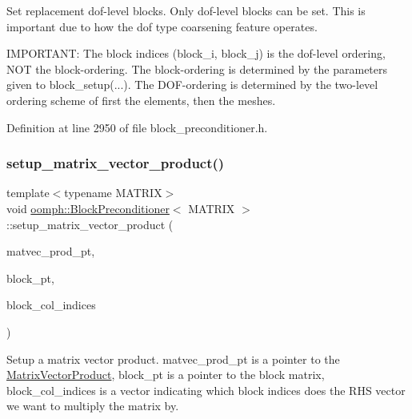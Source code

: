 Set replacement dof-\/level blocks. Only dof-\/level blocks can be set. This is important due to how the dof type coarsening feature operates. 

I\+M\+P\+O\+R\+T\+A\+NT\+: The block indices (block\+\_\+i, block\+\_\+j) is the dof-\/level ordering, N\+OT the block-\/ordering. The block-\/ordering is determined by the parameters given to block\+\_\+setup(...). The D\+O\+F-\/ordering is determined by the two-\/level ordering scheme of first the elements, then the meshes. 

Definition at line 2950 of file block\+\_\+preconditioner.\+h.

\mbox{\label{classoomph_1_1BlockPreconditioner_adbe1ae854ee9831649249d50162bb6a9}} 
\subsubsection{\texorpdfstring{setup\+\_\+matrix\+\_\+vector\+\_\+product()}{setup\_matrix\_vector\_product()}\hspace{0.1cm}{\footnotesize\ttfamily [1/2]}}
{\footnotesize\ttfamily template$<$typename M\+A\+T\+R\+IX$>$ \\
void \hyperlink{classoomph_1_1BlockPreconditioner}{oomph\+::\+Block\+Preconditioner}$<$ M\+A\+T\+R\+IX $>$\+::setup\+\_\+matrix\+\_\+vector\+\_\+product (\begin{DoxyParamCaption}\item[{\hyperlink{classoomph_1_1MatrixVectorProduct}{Matrix\+Vector\+Product} $\ast$}]{matvec\+\_\+prod\+\_\+pt,  }\item[{\hyperlink{classoomph_1_1CRDoubleMatrix}{C\+R\+Double\+Matrix} $\ast$}]{block\+\_\+pt,  }\item[{const \hyperlink{classoomph_1_1Vector}{Vector}$<$ unsigned $>$ \&}]{block\+\_\+col\+\_\+indices }\end{DoxyParamCaption})\hspace{0.3cm}{\ttfamily [inline]}}



Setup a matrix vector product. matvec\+\_\+prod\+\_\+pt is a pointer to the \hyperlink{classoomph_1_1MatrixVectorProduct}{Matrix\+Vector\+Product}, block\+\_\+pt is a pointer to the block matrix, block\+\_\+col\+\_\+indices is a vector indicating which block indices does the R\+HS vector we want to multiply the matrix by. 


